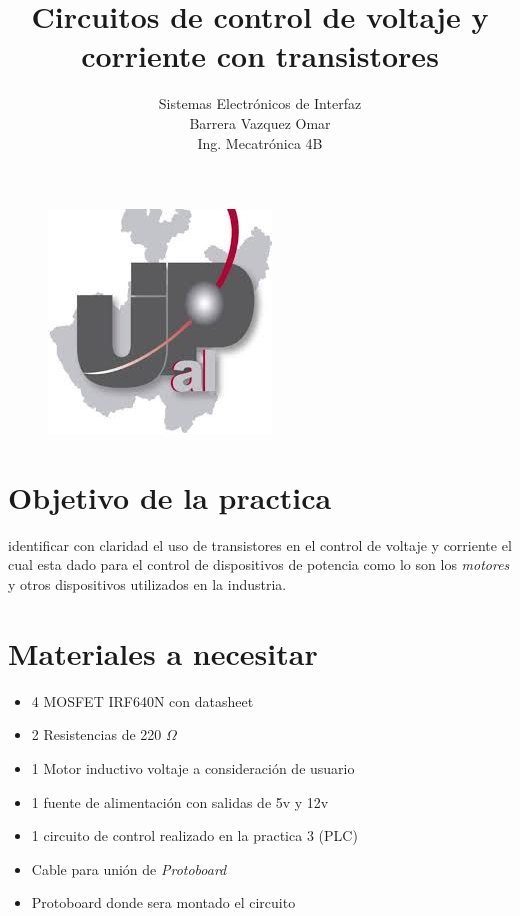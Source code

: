 \documentclass[11pt,a4paper]{article}
\title{Circuitos de control de voltaje y corriente con transistores}
\begin{document}
\maketitle


\begin{figure}[h]
\begin{center}
\includegraphics[scale=1]{1.jpeg}
\end{center}
\end{figure}


\begin{center}
\author{Sistemas Electrónicos de Interfaz\\
Barrera Vazquez Omar\\
Ing. Mecatrónica 4B}
\end{center}


\newpage

\section{Objetivo de la practica}

identificar con claridad el uso de transistores en el control de voltaje y corriente el cual esta dado para el control de dispositivos de potencia como lo son los \emph{motores} y otros dispositivos utilizados en la industria.

\section{Materiales a necesitar}

\begin{itemize}

\item 4 MOSFET IRF640N con datasheet
\item 2 Resistencias de 220 $\Omega$
\item 1 Motor inductivo voltaje a consideración de usuario
\item 1 fuente de alimentación con salidas de 5v y 12v
\item 1 circuito de control realizado en la practica 3 (PLC)
\item Cable para unión de \emph{Protoboard}
\item Protoboard donde sera montado el circuito

\end{itemize}
\end{document}
